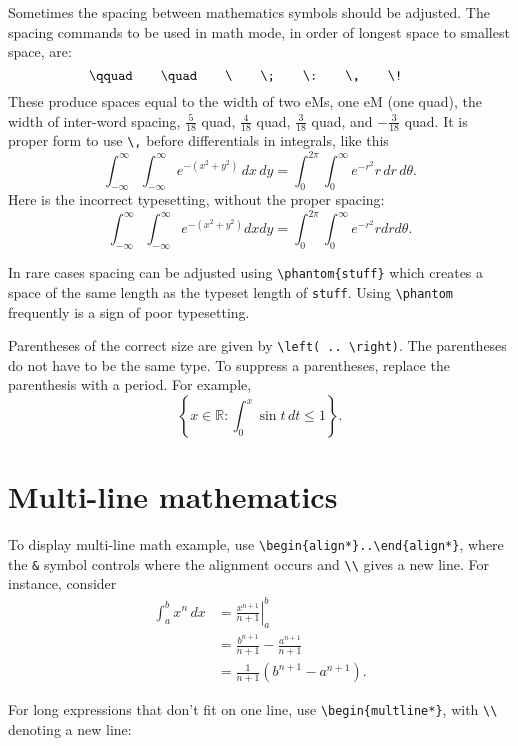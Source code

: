 \documentclass{article}
\begin{document}
Sometimes the spacing between mathematics symbols should be adjusted.  The
spacing commands to be used in math mode, in order of longest space to smallest
space, are:
\[
  \verb~\qquad~ \qquad
  \verb~\quad~  \qquad
  \verb~\~      \qquad
  \verb~\;~     \qquad
  \verb~\:~     \qquad
  \verb~\,~     \qquad
  \verb~\!~     \qquad
\]
These produce spaces equal to the width of two eMs, one eM (one quad), the
width of inter-word spacing, \(\frac{5}{18}\) quad, \(\frac{4}{18}\) quad,
\(\frac{3}{18}\) quad, and \(-\frac{3}{18}\) quad.  It is proper form to use
\verb~\,~ before differentials in integrals, like this
\[
  \int_{-\infty}^\infty \int_{-\infty}^\infty e^{-(x^2+y^2)} \, dx \, dy
  = \int_0^{2 \pi} \int_0^\infty e^{-r^2} r \, dr \, d\theta.
\]
Here is the incorrect typesetting, without the proper spacing:
\[
  \int_{-\infty}^\infty \int_{-\infty}^\infty e^{-(x^2+y^2)}  dx  dy
  = \int_0^{2 \pi} \int_0^\infty e^{-r^2} r dr d\theta.
\]

In rare cases spacing can be adjusted using \verb~\phantom{stuff}~ which
creates a space of the same length as the typeset length of \verb~stuff~.
Using \verb~\phantom~ frequently is a sign of poor typesetting.

Parentheses of the correct size are given by \verb~\left( .. \right)~.  The
parentheses do not have to be the same type.  To suppress a parentheses,
replace the parenthesis with a period.  For example,
\[ \left \{ x \in \mathbb{R} : \int_0^x \sin t \, dt \leq 1 \right \}. \]

\section{Multi-line mathematics}

To display multi-line math example, use \verb~\begin{align*}..\end{align*}~,
where the \verb~&~ symbol controls where the alignment occurs and \verb~\\~
gives a new line.  For instance, consider
\begin{align}
  \int_a^b x^n \, dx
 & = \left. \frac{x^{n+1}}{n+1} \right|_a^b   \\
 & = \frac{b^{n+1}}{n+1} -\frac{a^{n+1}}{n+1} \nonumber \\
 & = \frac{1}{n+1}(b^{n+1}-a^{n+1}).
\end{align}

For long expressions that don't fit on one line, use
\verb~\begin{multline*}~, with \verb~\\~ denoting a new line:
\end{document}
